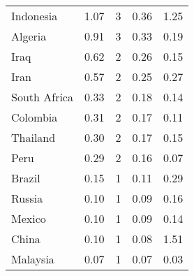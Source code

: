 \begin{longtable}[t]{lrrrr}
Indonesia & 1.07 & 3 & 0.36 & 1.25\\
Algeria & 0.91 & 3 & 0.33 & 0.19\\
Iraq & 0.62 & 2 & 0.26 & 0.15\\
Iran & 0.57 & 2 & 0.25 & 0.27\\
South Africa & 0.33 & 2 & 0.18 & 0.14\\
Colombia & 0.31 & 2 & 0.17 & 0.11\\
Thailand & 0.30 & 2 & 0.17 & 0.15\\
Peru & 0.29 & 2 & 0.16 & 0.07\\
Brazil & 0.15 & 1 & 0.11 & 0.29\\
Russia & 0.10 & 1 & 0.09 & 0.16\\
Mexico & 0.10 & 1 & 0.09 & 0.14\\
China & 0.10 & 1 & 0.08 & 1.51\\
Malaysia & 0.07 & 1 & 0.07 & 0.03\\
\bottomrule
\end{longtable}